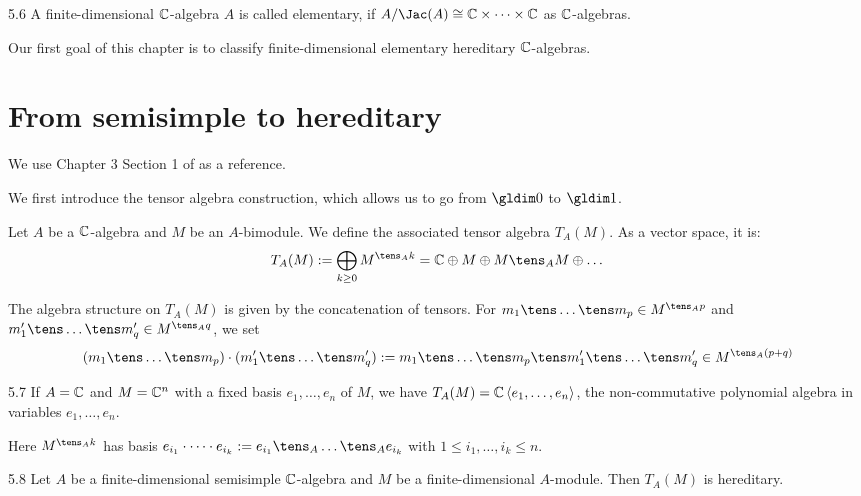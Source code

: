 \documentclass[twoside = false,	%
		headsepline,		%
		parskip = true,
		]{scrbook}						%
\begin{document}
    \begin{definition}{}{5.6}
        A finite-dimensional $\mathbb C$-algebra $A$ is called elementary, if $A/\Jac(A) \cong \C \times \dots \times \C$ as $\mathbb C$-algebras. 
    \end{definition}

    Our first goal of this chapter is to classify finite-dimensional elementary hereditary $\mathbb C$-algebras.

\section{From semisimple to hereditary}
    We use Chapter $3$ Section 1 of \cite{Auslander.1994} as a reference.

    We first introduce the tensor algebra construction, which allows us to go from $\gldim 0 $ to $\gldim 1$.

    Let $A$ be a $\mathbb C$-algebra and $M$ be an $A$-bimodule. We define the associated tensor algebra $T_A(M)$. As a vector space, it is:
    \begin{equation*}
        T_A(M) := \bigoplus_{k \geq 0} M^{\tens_A k} = \C \oplus M \oplus M \tens_A M \oplus \dots
    \end{equation*}

    The algebra structure on $T_A(M)$ is given by the concatenation of tensors. For $m_1 \tens \dots \tens m_p \in M^{\tens_A p}$ and $m'_1 \tens \dots \tens m'_q \in M^{\tens_A q}$, we set
    \begin{equation*}
        (m_1 \tens \dots \tens m_p) \cdot (m'_1 \tens \dots \tens m'_q) := m_1 \tens \dots \tens m_p \tens m'_1 \tens \dots \tens m'_q \in M^{\tens_A (p+q)}
    \end{equation*}

    \begin{example}{}{5.7}
        If $A=\mathbb C$ and $M = \mathbb C^n$ with a fixed basis $e_1,\dots,e_n$ of $M$, we have $T_A(M) = \mathbb C \left\langle e_1,\dots,e_n\right\rangle$, the non-commutative polynomial algebra in variables $e_1,\dots,e_n$.

        Here $M^{\tens_A k }$ has basis $e_{i_1} \cdot \dots \cdot e_{i_k} := e_{i_1} \tens_A \dots \tens_A e_{i_k}$ with $1 \leq i_1, \dots, i_k \leq n$.
    \end{example}

    \begin{proposition}{}{5.8}
        Let $A$ be a finite-dimensional semisimple $\mathbb C$-algebra and $M$ be a finite-dimensional $A$-module. Then $T_A(M)$ is hereditary.
    \end{proposition}
\end{document}
